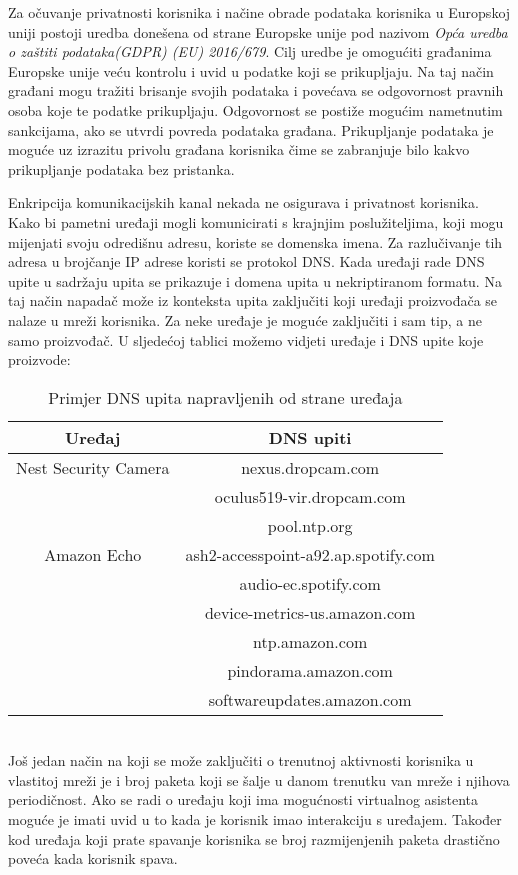 \documentclass[times, utf8, diplomski]{fer}
\begin{document}
Za očuvanje privatnosti korisnika i načine obrade podataka korisnika u Europskoj uniji postoji uredba donešena od strane Europske unije pod nazivom \emph{Opća uredba o zaštiti podataka(GDPR) (EU) 2016/679}\citep{GDPR}. Cilj uredbe je omogućiti građanima Europske unije veću kontrolu i uvid u podatke koji se prikupljaju. Na taj način građani mogu tražiti brisanje svojih podataka i povećava se odgovornost pravnih osoba koje te podatke prikupljaju. Odgovornost se postiže mogućim nametnutim sankcijama, ako se utvrdi povreda podataka građana. Prikupljanje podataka je moguće uz izrazitu privolu građana korisnika čime se zabranjuje bilo kakvo prikupljanje podataka bez pristanka. 

Enkripcija komunikacijskih kanal nekada ne osigurava i privatnost korisnika. Kako bi pametni uređaji mogli komunicirati s krajnjim poslužiteljima, koji mogu mijenjati svoju odredišnu adresu, koriste se domenska imena. Za razlučivanje tih adresa u brojčanje IP adrese koristi se protokol DNS. Kada uređaji rade DNS upite u sadržaju upita se prikazuje i domena upita u nekriptiranom formatu. Na taj način napadač može iz konteksta upita zaključiti koji uređaji proizvođača se nalaze u mreži korisnika. Za neke uređaje je moguće zaključiti i sam tip, a ne samo proizvođač. U sljedećoj tablici možemo vidjeti uređaje i DNS upite koje proizvode:
\begin{table}[h]
    \centering
    \begin{tabular}{| c | c |} 
    \hline
    \textbf{Uređaj} & \textbf{DNS upiti} \\
    \hline\hline
    Nest Security Camera & nexus.dropcam.com \\
     & oculus519-vir.dropcam.com \\
     & pool.ntp.org \\
    \hline
    Amazon Echo & ash2-accesspoint-a92.ap.spotify.com \\ 
     & audio-ec.spotify.com \\ 
     & device-metrics-us.amazon.com \\ 
     & ntp.amazon.com \\ 
     & pindorama.amazon.com \\ 
     & softwareupdates.amazon.com \\
    \hline
    \end{tabular}
    \caption{Primjer DNS upita napravljenih od strane uređaja \citep{Apthorpe2017May}}
    \label{tab:confusion}
\end{table} \\
Još jedan način na koji se može zaključiti o trenutnoj aktivnosti korisnika u vlastitoj mreži je i broj paketa koji se šalje u danom trenutku van mreže i njihova periodičnost. Ako se radi o uređaju koji ima mogućnosti virtualnog asistenta moguće je imati uvid u to kada je korisnik imao interakciju s uređajem. Također kod uređaja koji prate spavanje korisnika se broj razmijenjenih paketa drastično poveća kada korisnik spava.\citep{Apthorpe2017May}
\end{document}
